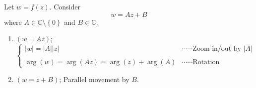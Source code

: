 \documentclass[12pt,openany]{book}
\theoremstyle{definition}
\newcommand{\set}[1]{\left\{#1\right\}}
\newcommand{\C}{\mathbb{C}}
\newcommand{\abs}[1]{\left\lvert #1 \right\rvert}
\begin{document}
	\begin{tcolorbox}[colback=white,colframe=defcolor,arc=5pt,title={\color{white}\bf Linear Transformation}]
		Let $w=f(z)$. Consider \[
		w=Az+B
		\] where $A\in\C\setminus\set{0}$ and $B\in\C$.
		\begin{enumerate}[(1)]
			\item $(w=Az)$; \[
			\begin{cases}
				\abs{w}=\abs{A}\abs{z}&\cdots\cdots\text{Zoom in/out by $\abs{A}$}\\
				\\
				\arg(w)=\arg(Az)=\arg(z)+\arg(A)&\cdots\cdots \text{Rotation}
			\end{cases}
			\]
			\item $(w=z+B)$; Parallel movement by $B$.
		\end{enumerate}
	\end{tcolorbox}
	\vspace{4pt}
\end{document}
